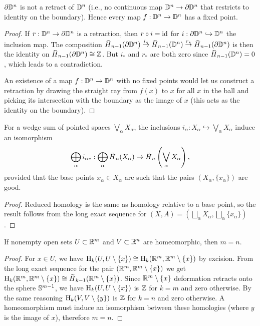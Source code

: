 \begin{cor}
    $\partial \mathbb{D}^n$ is not a retract of $\mathbb{D}^n$ (i.e., no continuous map $\mathbb{D}^n\to \partial \mathbb{D}^n$ that restricts to identity on the boundary). Hence every map $f:\mathbb{D}^n\to \mathbb{D}^n$ has a fixed point.
\end{cor}
\begin{proof}
     If $r:\mathbb{D}^n\to \partial \mathbb{D}^n$ is a retraction, then $r\circ i=\operatorname{id}$ for $i:\partial \mathbb{D}^n\hookrightarrow \mathbb{D}^n$ the inclusion map. The composition $\wt{H}_{n-1}(\partial \bbD^n)\overset{i_\ast}\to \wt{H}_{n-1}(\bbD^n)\overset{r_\ast}\to \wt{H}_{n-1}(\partial \bbD^n)$ is then the identity on $\wt{H}_{n-1}(\partial \bbD^n)\cong \bbZ$. But $i_\ast$ and $r_\ast$ are both zero since $\wt{H}_{n-1}(\bbD^n)=0$, which leads to a contradiction.
     
     An existence of a map $f:\mathbb{D}^n\to \mathbb{D}^n$ with no fixed points would let us construct a retraction by drawing the straight ray from $f(x)$ to $x$ for all $x$ in the ball and picking its intersection with the boundary as the image of $x$ (this acts as the identity on the boundary).
\end{proof}



\begin{cor}
    For a wedge sum of pointed spaces $\bigvee_{\alpha}X_\alpha$, the inclusions $i_\alpha:X_\alpha\hookrightarrow \bigvee_{\alpha}X_\alpha$ induce an isomorphism 
    \[\bigoplus_\alpha i_{\alpha\ast}:\bigoplus_\alpha\wt{H}_n(X_\alpha)\to \wt{H}_n\left(\bigvee_{\alpha}X_\alpha\right),\]
    provided that the base points $x_\alpha\in X_\alpha$ are such that the pairs $(X_\alpha,\{x_\alpha\})$ are good.
\end{cor}
\begin{proof}
     Reduced homology is the same as homology relative to a base point, so the result follows from the long exact sequence for $(X,A)=\left(\bigsqcup_\alpha X_\alpha, \bigsqcup_\alpha \{x_\alpha\}\right)$.
\end{proof}

\begin{cor}
    If nonempty open sets $U\subset \mathbb{R}^m$ and $V\subset \mathbb{R}^n$ are homeomorphic, then $m=n$.
\end{cor}
\begin{proof}
     For $x\in U$, we have $\mathrm{H}_k(U,U\setminus \{x\})\cong \mathrm{H}_k(\mathbb{R}^m,\mathbb{R}^m\setminus \{x\})$ by excision. From the long exact sequence for the pair $(\mathbb{R}^m,\mathbb{R}^m\setminus\{x\})$ we get $\rmH_k(\bbR^m,\bbR^m\setminus\{x\})\cong \wt{H}_{k-1}(\bbR^m\setminus\{x\})$. Since $\mathbb{R}^m\setminus\{x\}$ deformation retracts onto the sphere $\mathbb{S}^{m-1}$, we have $\mathrm{H}_k(U,U\setminus\{x\})$ is $\mathbb{Z}$ for $k=m$ and zero otherwise. By the same reasoning $\mathrm{H}_k(V,V\setminus\{y\})$ is $\mathbb{Z}$ for $k=n$ and zero otherwise. A homeomorphism must induce an isomorphism between these homologies (where $y$ is the image of $x$), therefore $m=n$.
\end{proof}





